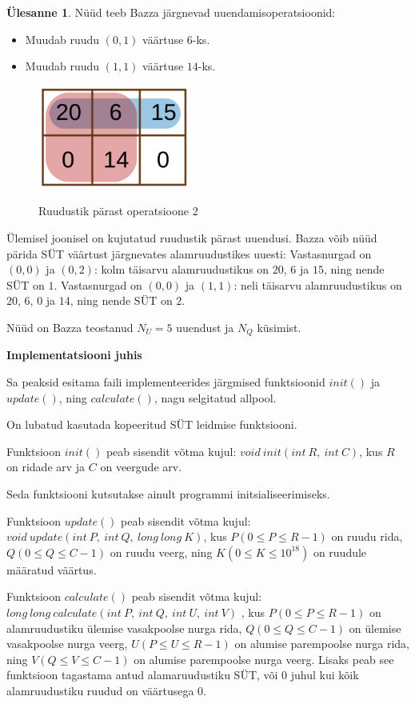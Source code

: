 \documentclass{trkut}
\theoremstyle{definition}
\newtheorem*{Text}{Ülesanne}
\begin{document}
\begin{Text}
Nüüd teeb Bazza järgnevad uuendamisoperatsioonid:
\begin{itemize}
    \item Muudab ruudu $(0,1)$ väärtuse $6$-ks.
    \item Muudab ruudu $(1,1)$ väärtuse $14$-ks.
\end{itemize}

\begin{figure}[H]%
    \includegraphics[width=5cm]{ioiruut2.png}%
    \caption{Ruudustik pärast operatsioone 2}%
    \label{CPH}%
\end{figure}
Ülemisel joonisel on kujutatud ruudustik pärast uuendusi. Bazza võib nüüd pärida SÜT väärtust järgnevates alamruudustikes uuesti:
Vastasnurgad on $(0,0)$ ja $(0,2)$: kolm täisarvu alamruudustikus on $20$, $6$ ja $15$, ning nende SÜT on $1$.
Vastasnurgad on $(0,0)$ ja $(1,1)$: neli täisarvu alamruudustikus on $20$, $6$, $0$ ja $14$, ning nende SÜT on $2$.

Nüüd on Bazza teostanud $N_U=5$ uuendust ja $N_Q$ küsimist.

\textbf{Implementatsiooni juhis}

Sa peaksid esitama faili implementeerides järgmised funktsioonid $init()$ ja $update()$, ning $calculate()$, nagu selgitatud allpool.

On lubatud kasutada kopeeritud SÜT leidmise funktsiooni.

Funktsioon $init()$ peab sisendit võtma kujul:
$void\ init(int\ R,\ int\ C)$, kus $R$ on ridade arv ja $C$ on veergude arv.

Seda funktsiooni kutsutakse ainult programmi initsialiseerimiseks.

Funktsioon $update()$ peab sisendit võtma kujul:
$void\ update(int\ P,\ int\ Q,\ long\ long\ K)$, kus $P$$(0\le P\le R-1)$ on ruudu rida, $Q$$(0\le Q\le C-1)$ on ruudu veerg, ning $K$$(0\le K\le 10^{18})$ on ruudule määratud väärtus.


Funktsioon $calculate()$ peab sisendit võtma kujul:
$long\ long\ calculate(int\ P,\ int\ Q,\ int\ U,\ int\ V)$ , kus $P$$(0\le P\le R-1)$ on alamruudustiku ülemise vasakpoolse nurga rida, $Q$$(0\le Q\le C-1)$ on ülemise vasakpoolse nurga veerg, $U$$(P\le U\le R-1)$ on alumise parempoolse nurga rida, ning $V$$(Q\le V\le C-1)$ on alumise parempoolse nurga veerg.
Lisaks peab see funktsioon tagastama antud alamaruudustiku SÜT, või $0$ juhul kui kõik alamruudustiku ruudud on väärtusega $0$.


\end{Text}
\end{document}
